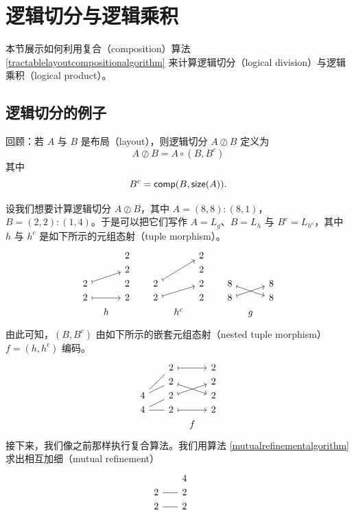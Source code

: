 \section{逻辑切分与逻辑乘积}
本节展示如何利用复合（composition）算法 \ref{tractablelayoutcompositionalgorithm} 来计算逻辑切分（logical division）与逻辑乘积（logical product）。
\subsection{逻辑切分的例子}
回顾：若 $A$ 与 $B$ 是布局（layout），则逻辑切分 $A \oslash B$ 定义为
\[
A \oslash B = A \circ (B,B^c)
\]
其中
\[
B^c = \mathsf{comp}(B, \mathsf{size}(A)).
\]

\begin{example}
    设我们想要计算逻辑切分 $A \oslash B$，其中 $A = (8,8):(8,1)$，$B = (2,2):(1,4)$。于是可以把它们写作 $A = L_g$、$B = L_h$ 与 $B^c = L_{h^c}$，其中 $h$ 与 $h^c$ 是如下所示的元组态射（tuple morphism）。
    \[ \begin{tikzcd} [row sep = 1, column sep = 8]
     & & 2 & & & & 2 & & & & \\
     & & 2 & & & & 2 & & & & \\
    2 \ar[urr,mapsto] & & 2 & & 2 \ar[uurr,mapsto] & & 2 & & 8 \ar[drr,mapsto] & & 8\\
    2 \ar[rr,mapsto] & & 2 & & 2 \ar[urr,mapsto] & & 2 & & 8 \ar[urr,mapsto] & & 8\\
     & h & & & & h^c & & & & g &   \\
    \end{tikzcd} \]
    由此可知，$(B,B^c)$ 由如下所示的嵌套元组态射（nested tuple morphism）$f = (h,h^c)$ 编码。
    \[ \begin{tikzcd} [row sep = 1, column sep = 8]
      & & 2 \ar[rr,mapsto] & & 2 \\
      & & 2 \ar[drr,mapsto] & & 2\\
    4 \ar[urr,-] \ar[uurr,-] & & 2 \ar[urr,mapsto] & & 2 \\
    4 \ar[rr,-] \ar[urr,-]  & & 2 \ar[rr,mapsto] & & 2\\
    & & & f &
    \end{tikzcd} \]
    接下来，我们像之前那样执行复合算法。我们用算法 \ref{mutualrefinementalgorithm} 求出相互加细（mutual refinement）
    \[ \begin{tikzcd} [row sep = 1, column sep = 8]
       & & 4 & & \\
       2 \ar[rr,-] & & 2 & & \\
       2 \ar[rr,-]& & 2 & & \\

\end{tikzcd}\]
\end{example}

